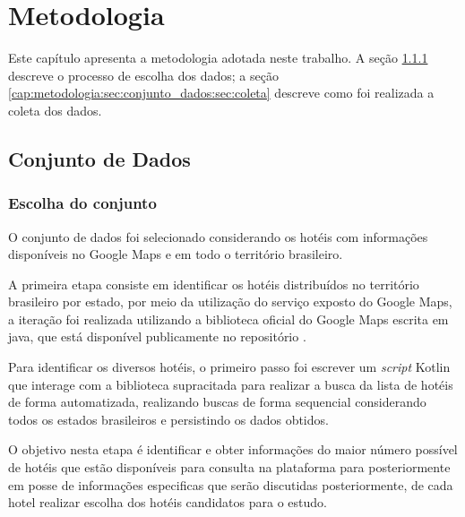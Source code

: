 \chapter{Metodologia}
\label{cap:metodologia}

Este capítulo apresenta a metodologia adotada neste trabalho. A seção \ref{cap:metodologia:sec:conjunto_dados:sec:escolha_conjunto} descreve o processo de escolha dos dados; a seção \ref{cap:metodologia:sec:conjunto_dados:sec:coleta} descreve como foi realizada a coleta dos dados.

\section{Conjunto de Dados}
\label{cap:metodologia:sec:conjunto_dados}

\subsection{Escolha do conjunto}
\label{cap:metodologia:sec:conjunto_dados:sec:escolha_conjunto}

O conjunto de dados foi selecionado considerando os hotéis com informações disponíveis no Google Maps e em todo o território brasileiro.

A primeira etapa consiste em identificar os hotéis distribuídos no território brasileiro por estado, por meio da utilização do serviço exposto do Google Maps, a iteração foi realizada utilizando a biblioteca oficial do Google Maps escrita em java, que está disponível publicamente no repositório .

Para identificar os diversos hotéis, o primeiro passo foi escrever um \emph{script} Kotlin  que interage com a biblioteca supracitada para realizar a busca da lista de hotéis de forma automatizada, realizando buscas de forma sequencial considerando todos os estados brasileiros e persistindo os dados obtidos.

O objetivo nesta etapa é identificar e obter informações do maior número possível de hotéis que estão disponíveis para consulta na plataforma para posteriormente em posse de informações especificas que serão discutidas posteriormente, de cada hotel realizar escolha dos hotéis candidatos para o estudo.

